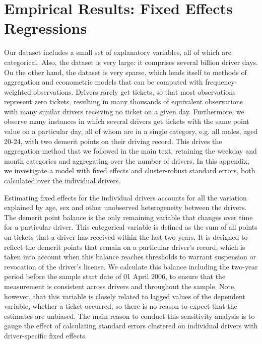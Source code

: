 \section{Empirical Results: Fixed Effects Regressions}
\label{app:FE_CRVE}


Our dataset includes a small set of explanatory variables, all of which are categorical. 
Also, the dataset is very large: it comprises several billion driver days. 
On the other hand, the dataset is very sparse, 
which lends itself to methods of aggregation and
econometric models that can be computed with frequency-weighted observations.
Drivers rarely get tickets, so that most observations represent zero tickets, 
resulting in many thousands of equivalent observations with many similar drivers 
receiving no ticket on a given day. 
Furthermore, we observe many instances in which several drivers 
get tickets with the same point value on a particular day, 
all of whom are in a single category, 
e.g. all males, aged 20-24, with two demerit points on their driving record. 
This drives the aggregation method that we followed in the main text, 
retaining the weekday and month categories and aggregating over the number of drivers. 
In this appendix, we investigate a model with fixed effects and cluster-robust standard errors, 
both calculated over the individual drivers. 

Estimating fixed effects for the individual drivers accounts for all the variation explained by age, sex and other unobserved heterogeneity between the drivers.
The demerit point balance is the only remaining variable that changes over time for a particular driver. 
% 
This categorical variable is defined as the sum of all points on tickets that a driver has received within the last two years. 
It is designed to reflect the demerit points that remain on a particular driver's record, 
which is taken into account when this balance reaches thresholds to warrant suspension or revocation of the driver's license. 
We calculate this balance including the two-year period before the sample start date of 01 April 2006, to ensure that the measurement is consistent across drivers and throughout the sample. 
Note, however, that this variable is closely related to lagged values of the dependent variable, 
whether a ticket occurred, so there is no reason to expect that the estimates are unbiased. 
The main reason to conduct this sensitivity analysis is to gauge the effect of
calculating standard errors clustered on individual drivers
with driver-specific fixed effects. 


